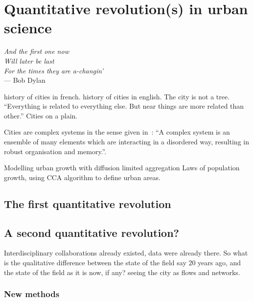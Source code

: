 


\chapter{Quantitative revolution(s) in urban science}
\label{chap:quantitative_revolutions}

\begin{flushright}{\slshape    
And the first one now\\
Will later be last\\
For the times they are a-changin'} \\ \medskip
--- Bob Dylan 
\end{flushright}

\cite{Bairoch:1985} history of cities in french.
\cite{Mumford:1961} history of cities in english.
\cite{Alexander:1964} The city is not a tree.
\cite{Tobler:1970} ``Everything is related to everything else. But near things
are more related than other.''
\cite{Glass:1971} Cities on a plain.


Cities are complex systems in the sense given in~\cite{Ladyman:2013}: ``A complex system is an ensemble of many elements
which are interacting in a disordered way, resulting in robust organisation and
memory.''.


\cite{Makse:1995} Modelling urban growth with diffusion limited aggregation
\cite{Rozenfeld:2008} Laws of population growth, using CCA algorithm to define
urban areas.

\section{The first quantitative revolution}
\label{sec:the_first_quantitative_revolution}


\section{A second quantitative revolution?}
\label{sec:a_second_quantitative_revolution_}

Interdisciplinary collaborations already existed, data were already there. So
what is the qualitative difference between the state of the field say $20$ years
ago, and the state of the field as it is now, if any?\cite{Batty:2008,Batty:2012,Batty:2013} seeing the city as flows and networks.

    \subsection{New methods}
    \label{sub:new_methods}

